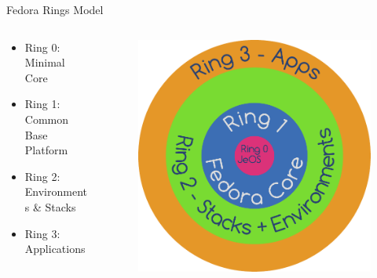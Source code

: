 \documentclass{beamer}
\begin{document}
\begin{frame}{Fedora Rings Model}
  \begin{columns}
    \begin{column}{.5\textwidth}
      \begin{itemize}
	\item Ring 0: Minimal Core
	\item Ring 1: Common Base Platform
	\item Ring 2: Environments \& Stacks
	\item Ring 3: Applications
      \end{itemize}
    \end{column}
    \begin{column}{.5\textwidth}
      \begin{figure}[htbp]
        \centering
        \includegraphics[width=.8\textwidth]{fedora-next-ring.pdf}
      \end{figure}
    \end{column}
  \end{columns}
\end{frame}
\end{document}
